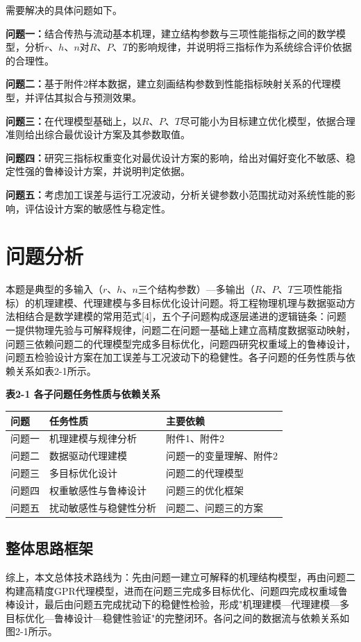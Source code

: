 \documentclass[withoutpreface]{cumcmthesis}
\begin{document}
需要解决的具体问题如下。

\textbf{问题一：}结合传热与流动基本机理，建立结构参数与三项性能指标之间的数学模型，分析$r$、$h$、$n$对$R$、$P$、$T$的影响规律，并说明将三指标作为系统综合评价依据的合理性。

\textbf{问题二：}基于附件2样本数据，建立刻画结构参数到性能指标映射关系的代理模型，并评估其拟合与预测效果。

\textbf{问题三：}在代理模型基础上，以$R$、$P$、$T$尽可能小为目标建立优化模型，依据合理准则给出综合最优设计方案及其参数取值。

\textbf{问题四：}研究三指标权重变化对最优设计方案的影响，给出对偏好变化不敏感、稳定性强的鲁棒设计方案，并说明判定依据。

\textbf{问题五：}考虑加工误差与运行工况波动，分析关键参数小范围扰动对系统性能的影响，评估设计方案的敏感性与稳定性。

\section{问题分析}
本题是典型的多输入（$r$、$h$、$n$三个结构参数）—多输出（$R$、$P$、$T$三项性能指标）的机理建模、代理建模与多目标优化设计问题。将工程物理机理与数据驱动方法相结合是数学建模的常用范式[4]，五个子问题构成逐层递进的逻辑链条：问题一提供物理先验与可解释规律，问题二在问题一基础上建立高精度数据驱动映射，问题三依赖问题二的代理模型完成多目标优化，问题四研究权重域上的鲁棒设计，问题五检验设计方案在加工误差与工况波动下的稳健性。各子问题的任务性质与依赖关系如表2-1所示。

\textbf{表2-1 各子问题任务性质与依赖关系}

\begin{table}[htbp]
\centering
\small
\begin{tabularx}{\textwidth}{XXX}
\toprule
问题 & 任务性质 & 主要依赖 \\
\midrule
问题一 & 机理建模与规律分析 & 附件1、附件2 \\
问题二 & 数据驱动代理建模 & 问题一的变量理解、附件2 \\
问题三 & 多目标优化设计 & 问题二的代理模型 \\
问题四 & 权重敏感性与鲁棒设计 & 问题三的优化框架 \\
问题五 & 扰动敏感性与稳健性分析 & 问题二、问题三的方案 \\
\bottomrule
\end{tabularx}
\end{table}
\subsection{整体思路框架}
综上，本文总体技术路线为：先由问题一建立可解释的机理结构模型，再由问题二构建高精度GPR代理模型，进而在问题三完成多目标优化、问题四完成权重域鲁棒设计，最后由问题五完成扰动下的稳健性检验，形成"机理建模—代理建模—多目标优化—鲁棒设计—稳健性验证"的完整闭环。各问之间的数据流与依赖关系如图2-1所示。
\end{document}
